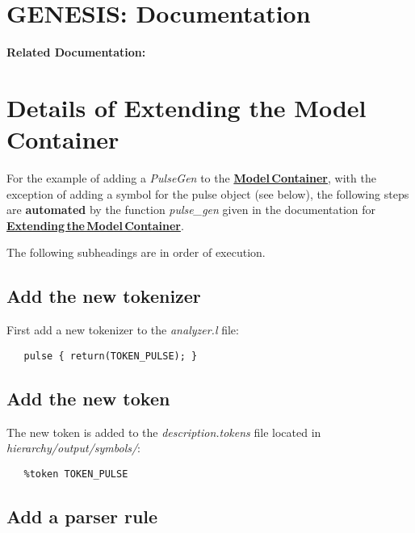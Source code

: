 \documentclass[12pt]{article}
\begin{document}
\section*{GENESIS: Documentation}

{\bf Related Documentation:}

\section*{Details of Extending the Model\,Container}

For the example of adding a {\it PulseGen} to the \href{../model-container/model-container.tex}{\bf Model\,Container}, with the exception of adding a symbol for the pulse object (see below), the following steps are {\bf automated} by the function {\it pulse\_gen} given in the documentation for \href{../genesis-extend-model-container/genesis-extend-model-container.tex}{\bf Extending\,the\,Model\,Container}.

The following subheadings are in order of execution.

\subsection*{Add the new tokenizer}

First add a new tokenizer to the {\it analyzer.l} file:
\begin{verbatim}
   pulse { return(TOKEN_PULSE); }
\end{verbatim}

\subsection*{Add the new token}

The new token is added to the {\it description.tokens} file located in {\it hierarchy/output/symbols/}:
\begin{verbatim}
   %token TOKEN_PULSE
\end{verbatim}

\subsection*{Add a parser rule}
\end{document}
